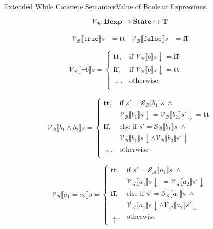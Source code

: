 \documentclass{beamer}
\newcommand{\Bexp}{\textbf{Bexp}}
\newcommand{\State}{\textbf{State}}
\newcommand{\T}{\textbf{T}}
\newcommand{\true}{\texttt{true}}
\newcommand{\false}{\texttt{false}}
\newcommand{\sem}[2]{\mathcal{#1} \llbracket #2 \rrbracket}
\newcommand{\tr}{\mathbf{tt}}
\newcommand{\ff}{\mathbf{ff}}
\newcommand{\undefined}{\uparrow}
\newcommand{\defined}{\!\downarrow}
\begin{document}
\begin{frame}{Extended While Concrete Semantics}{Value of Boolean Expressions}

    $$\mathcal{V_B} : \Bexp \to \State \hookrightarrow \T$$
    \begin{overprint}
        \begin{gather*}
            \begin{aligned}
                \sem{V_B}{\true}s  & = \tr &
                \sem{V_B}{\false}s & = \ff   \\
            \end{aligned} \\
            \sem{V_B}{\neg b}s =
            \begin{cases}
                \tr,        & \mbox{if } \sem{V_B}{b}s \defined = \ff \\
                \ff,        & \mbox{if } \sem{V_B}{b}s \defined = \tr \\
                \undefined, & \mbox{otherwise}
            \end{cases}
        \end{gather*}

        \begin{equation*}
            \sem{V_B}{b_1 \wedge b_2}s =
            \begin{cases}
                \tr,
                 & \mbox{if } s' = \sem{S_B}{b_1}s \;\wedge                   \\
                 & \sem{V_B}{b_1}s \defined = \sem{V_B}{b_2}s' \defined = \tr \\
                \ff,
                 & \mbox{else if } s' = \sem{S_B}{b_1}s \;\wedge              \\
                 & \sem{V_B}{b_1}s \defined \wedge \sem{V_B}{b_2}s' \defined  \\
                \undefined,
                 & \mbox{otherwise}
            \end{cases}
        \end{equation*}

        \begin{equation*}
            \sem{V_B}{a_1 = a_2}s =
            \begin{cases}
                \tr,
                 & \mbox{if } s' = \sem{S_A}{a_1}s \;\wedge                  \\
                 & \sem{V_A}{a_1}s \defined \;= \sem{V_A}{a_2}s' \defined    \\
                \ff,
                 & \mbox{else if } s' = \sem{S_A}{a_1}s \;\wedge             \\
                 & \sem{V_A}{a_1}s \defined \wedge \sem{V_A}{a_2}s' \defined \\
                \undefined,
                 & \mbox{otherwise}
            \end{cases}
        \end{equation*}


\end{overprint}
\end{frame}
\end{document}
